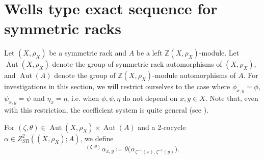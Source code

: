 \documentclass[11pt,reqno]{amsart}
\theoremstyle{definition}
\numberwithin{equation}{subsection}
\begin{document}
\section{Wells type exact sequence for symmetric racks}\label{sectionwellstype}
Let $(X,\rho_{X})$ be a symmetric rack and $A$ be a left $\mathbb{Z}(X, \rho_{X})$-module. Let $\operatorname{Aut}(X, \rho_{X})$ denote the group of symmetric rack automorphisms of $(X, \rho_{X})$, and $\operatorname{Aut}(A)$ denote the group of $\mathbb{Z}(X, \rho_{X})$-module automorphisms of $A$. For investigations in this section, we will restrict ourselves to the case where $\phi_{x, y}=\phi$, $\psi_{x, y}=\psi$ and $\eta_{x}=\eta$, i.e. when $\phi, \psi, \eta$ do not depend on $x, y \in X$. Note that, even with this restriction, the coefficient system is quite general (see \cite[Example 3.3]{KSS2024}).
\par

For $(\zeta, \theta) \in \operatorname{Aut}(X, \rho_{X}) \times \operatorname{Aut}(A)$ and a 2-cocycle $\alpha \in Z_{S R}^{2}((X, \rho_{X}); A)$, we define
$${}^{(\zeta,\theta)}\alpha_{x,y}\coloneqq\theta \big(\alpha_{\zeta^{-1}(x), \zeta^{-1}(y)} \big).$$
\end{document}
